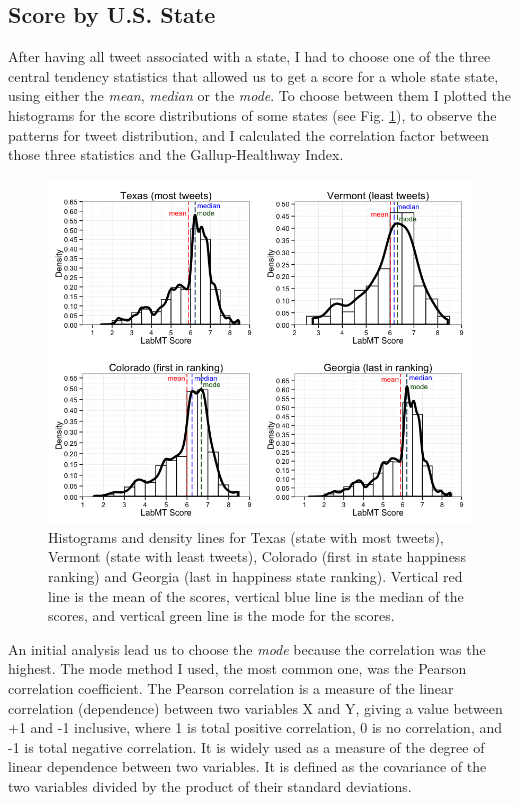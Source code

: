 \documentclass{llncs}
\begin{document}
\subsection{Score by U.S. State}
\label{sec:meth4}
After having all tweet associated with a state, I had to choose one of the three central tendency statistics that allowed us to get a score for a whole state state, using either the \emph{mean}, \emph{median} or the \emph{mode}. To choose between them I plotted the histograms for the score distributions of some states (see Fig. \ref{fig:tweets_distribution}), to observe the patterns for tweet distribution, and I calculated the correlation factor between those three statistics and the Gallup-Healthway Index.

\begin{figure}[!ht]
\centering
\includegraphics[width=\textwidth]{images/tweets_distribution}
\caption{Histograms and density lines for Texas (state with most tweets), Vermont (state with least tweets), Colorado (first in state happiness ranking) and Georgia (last in happiness state ranking). Vertical red line is the mean of the scores, vertical blue line is the median of the scores, and vertical green line is the mode for the scores.}
\label{fig:tweets_distribution}
\end{figure}

An initial analysis lead us to choose the \emph{mode} because the correlation was the highest. The mode method I used, the most common one, was the Pearson correlation coefficient. The Pearson correlation is a measure of the linear correlation (dependence) between two variables X and Y, giving a value between +1 and -1 inclusive, where 1 is total positive correlation, 0 is no correlation, and -1 is total negative correlation. It is widely used as a measure of the degree of linear dependence between two variables. It is defined as the covariance of the two variables divided by the product of their standard deviations. \cite{Pearson2006}
\end{document}
